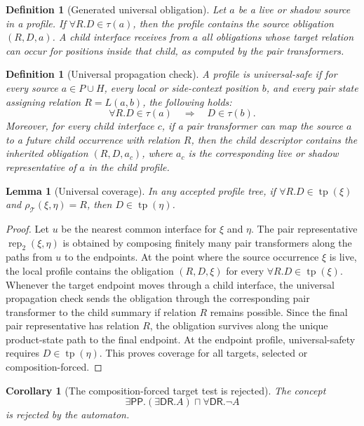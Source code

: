 \documentclass[11pt]{article}
\newtheorem{lemma}[theorem]{Lemma}
\newtheorem{corollary}[theorem]{Corollary}
\newtheorem{definition}[theorem]{Definition}
\newcommand{\PP}{\mathsf{PP}}
\newcommand{\DR}{\mathsf{DR}}
\newcommand{\tp}{\operatorname{tp}}
\begin{document}
\begin{definition}[Generated universal obligation]
Let $a$ be a live or shadow source in a profile.  If $\forall R.D\in\tau(a)$, then the profile contains the source obligation $(R,D,a)$.  A child interface receives from $a$ all obligations whose target relation can occur for positions inside that child, as computed by the pair transformers.
\end{definition}

\begin{definition}[Universal propagation check]
A profile is universal-safe if for every source $a\in P\cup H$, every local or side-context position $b$, and every pair state assigning relation $R=L(a,b)$, the following holds:
\[
  \forall R.D\in\tau(a)\quad\Longrightarrow\quad D\in\tau(b).
\]
Moreover, for every child interface $c$, if a pair transformer can map the source $a$ to a future child occurrence with relation $R$, then the child descriptor contains the inherited obligation $(R,D,a_c)$, where $a_c$ is the corresponding live or shadow representative of $a$ in the child profile.
\end{definition}

\begin{lemma}[Universal coverage]
In any accepted profile tree, if $\forall R.D\in\tp(\xi)$ and $\rho_\mathcal T(\xi,\eta)=R$, then $D\in\tp(\eta)$.
\end{lemma}

\begin{proof}
Let $u$ be the nearest common interface for $\xi$ and $\eta$.  The pair representative $\operatorname{rep}_2(\xi,\eta)$ is obtained by composing finitely many pair transformers along the paths from $u$ to the endpoints.  At the point where the source occurrence $\xi$ is live, the local profile contains the obligation $(R,D,\xi)$ for every $\forall R.D\in\tp(\xi)$.  Whenever the target endpoint moves through a child interface, the universal propagation check sends the obligation through the corresponding pair transformer to the child summary if relation $R$ remains possible.  Since the final pair representative has relation $R$, the obligation survives along the unique product-state path to the final endpoint.  At the endpoint profile, universal-safety requires $D\in\tp(\eta)$.  This proves coverage for all targets, selected or composition-forced.
\end{proof}

\begin{corollary}[The composition-forced target test is rejected]
The concept
\[
  \exists\PP.(\exists\DR.A)\sqcap\forall\DR.\neg A
\]
is rejected by the automaton.
\end{corollary}
\end{document}
